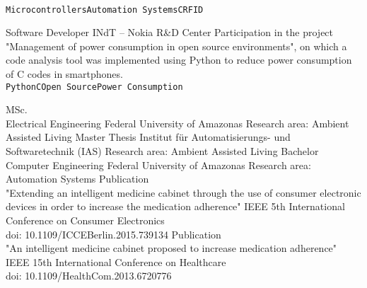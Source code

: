 \documentclass[10pt]{developercv} %
\begin{document}
\begin{entrylist}
{\begin{contributionlist}
    \end{contributionlist}\\
    \texttt{Microcontrollers}\slashsep\texttt{Automation Systems}\slashsep\texttt{C}\slashsep\texttt{RFID}}
  {Software Developer}
  {INdT -- Nokia R\&D Center}
  {Participation in the project "Management of power consumption in open source environments", on which a code analysis tool was implemented using Python to reduce
power consumption of C codes in smartphones.\\
  \texttt{Python}\slashsep\texttt{C}\slashsep\texttt{Open Source}\slashsep\texttt{Power Consumption}}
\end{entrylist}



\begin{entrylist}
  {MSc.\\Electrical Engineering}
  {Federal University of Amazonas}
  {Research area: Ambient Assisted Living}
  {Master Thesis}
  {Institut für Automatisierungs- und Softwaretechnik (IAS)}
  {Research area: Ambient Assisted Living}
  {Bachelor\\Computer Engineering}
  {Federal University of Amazonas}
  {Research area: Automation Systems}
  {Publication \\"Extending an intelligent medicine cabinet through the use of consumer electronic devices in order to increase the medication adherence"}
  {}
  {IEEE 5th International Conference on Consumer Electronics\\doi: 10.1109/ICCEBerlin.2015.739134}
  {Publication \\"An intelligent medicine cabinet proposed to increase medication adherence"}
  {}
  {IEEE 15th International Conference on Healthcare\\doi: 10.1109/HealthCom.2013.6720776}
\end{entrylist}
\end{document}
